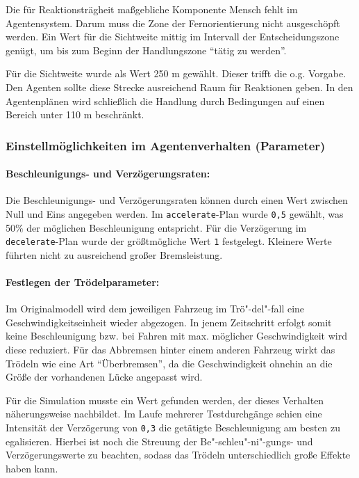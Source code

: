 Die für Reaktionsträgheit maßgebliche Komponente Mensch fehlt im Agentensystem. 
Darum muss die Zone der Fernorientierung nicht ausgeschöpft werden.
Ein Wert für die Sichtweite mittig im Intervall der Entscheidungszone genügt, um bis zum Beginn der Handlungszone \enquote{tätig zu werden}.

Für die Sichtweite wurde als Wert 250 m gewählt.
Dieser trifft die o.g. Vorgabe. 
Den Agenten sollte diese Strecke ausreichend Raum für Reaktionen geben. 
In den Agentenplänen wird schließlich die Handlung durch Bedingungen auf einen Bereich unter 110 m beschränkt.

\newpage

\subsubsection{Einstellmöglichkeiten im Agentenverhalten (Parameter)}%

\paragraph*{Beschleunigungs- und Verzögerungsraten:}
\label{sec:acc-dec-rate}
Die Beschleunigungs- und Verzögerungsraten können durch einen Wert zwischen Null und Eins angegeben werden.
Im \texttt{accelerate}-Plan wurde \texttt{0,5} gewählt, was \mbox{50$\%$} der möglichen Beschleunigung entspricht.
Für die Verzögerung im \texttt{decelerate}-Plan wurde der größtmögliche Wert \texttt{1} festgelegt. 
Kleinere Werte führten nicht zu ausreichend großer Bremsleistung.


\paragraph*{Festlegen der Trödelparameter:}
\label{sec:lingersweetspot}
Im Originalmodell wird dem jeweiligen Fahrzeug im Trö"-del"-fall eine Geschwindigkeitseinheit wieder abgezogen. 
In jenem Zeitschritt erfolgt somit keine Beschleunigung bzw. bei Fahren mit max. möglicher Geschwindigkeit wird diese reduziert. 
Für das Abbremsen hinter einem anderen Fahrzeug wirkt das Trödeln wie eine Art \enquote{Überbremsen}, da die Geschwindigkeit ohnehin an die Größe der vorhandenen Lücke angepasst wird.

Für die Simulation musste ein Wert gefunden werden, der dieses Verhalten näherungsweise nachbildet.
Im Laufe mehrerer Testdurchgänge schien eine Intensität der Verzögerung von \texttt{0,3} die getätigte Beschleunigung am besten zu egalisieren. 
Hierbei ist noch die Streuung der Be"-schleu"-ni"-gungs- und Verzögerungswerte zu beachten, sodass das Trödeln unterschiedlich große Effekte haben kann.

